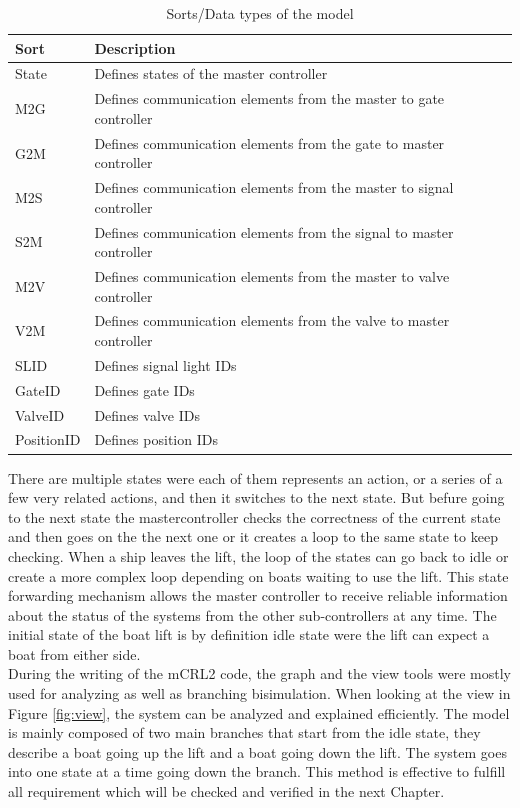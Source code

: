 \begin{table}[htbp]
	\centering
	\begin{tabular}{lp{10.5cm}l}
		\toprule
		\textbf{Sort} &  \textbf{Description} \\
		\hline
		State&  Defines states of the master controller \\
		M2G &  Defines communication elements from the master to gate controller\\
		G2M & Defines communication elements from the gate to master controller \\
		M2S &  Defines communication elements from the master to signal controller\\
		S2M &  Defines communication elements from the signal to master controller\\
		M2V &  Defines communication elements from the master to valve controller\\
		V2M &  Defines communication elements from the valve to master controller\\
		SLID &  Defines signal light IDs\\
		GateID &  Defines gate IDs\\
		ValveID &  Defines valve IDs\\
		PositionID   & Defines position IDs\\
		\bottomrule
	\end{tabular}%
		\caption{Sorts/Data types of the model}
	\label{tab:sors}%
\end{table}%
 There are multiple states were each of them represents an action, or a series of a few very related actions, and then it switches to the next state. But befure going to the next state the mastercontroller checks the correctness of the current state and then goes on the the next one or it creates a loop to the same state to keep checking. When a ship leaves the lift, the loop of the states can go back to idle or create a more complex loop depending on boats waiting to use the lift. This state forwarding mechanism allows the master controller to receive reliable information about the status of the systems from the other sub-controllers at any time. The initial state of the boat lift is by definition idle state were the lift can expect a boat from either side.\\
During the writing of the mCRL2 code, the graph and the view tools were mostly used for analyzing as well as branching bisimulation. When looking at the view in Figure \ref{fig:view}, the system can be analyzed and explained efficiently. The model is mainly composed of two main branches that start from the idle state, they describe a boat going up the lift and a boat going down the lift. The system goes into one state at a time going down the branch. This method is effective to fulfill all requirement which will be checked and verified in the next Chapter. 

